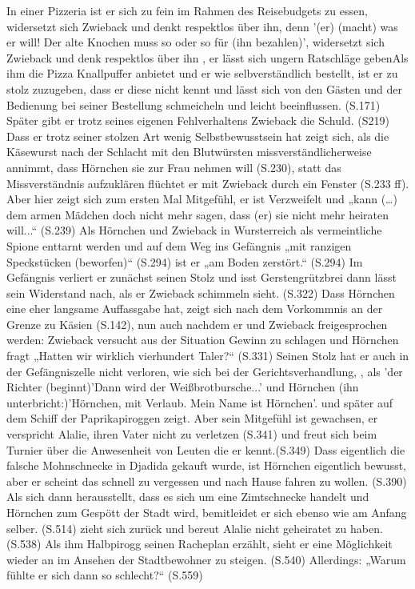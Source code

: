 {In einer Pizzeria ist er sich zu fein im Rahmen des Reisebudgets zu essen, widersetzt sich Zwieback und denkt respektlos über ihn\cite[S.170f]{pir}, denn '(er) (macht) was er will! Der alte Knochen muss so oder so für (ihn bezahlen)',\cite[S.170f]{pir} widersetzt sich Zwieback und denk respektlos über ihn \cite[S.170f]{pir}, er lässt sich ungern Ratschläge geben\cite[S.170f]{pir}\cite[S.219f]{pir}Als ihm die Pizza Knallpuffer anbietet und er wie selbverständlich bestellt, ist er zu stolz zuzugeben, dass er diese nicht kennt und lässt sich von den Gästen und der Bedienung bei seiner Bestellung schmeicheln und leicht beeinflussen. (S.171) Später gibt er trotz seines eigenen Fehlverhaltens Zwieback die Schuld. (S219) Dass er trotz seiner stolzen Art wenig Selbstbewusstsein hat zeigt sich, als die Käsewurst nach der Schlacht mit den Blutwürsten missverständlicherweise annimmt, dass Hörnchen sie zur Frau nehmen will (S.230), statt das Missverständnis aufzuklären flüchtet er mit Zwieback durch ein Fenster (S.233 ff). Aber hier zeigt sich zum ersten Mal Mitgefühl, er ist Verzweifelt und „kann (…) dem armen Mädchen doch nicht mehr sagen, dass (er) sie nicht mehr heiraten will...“ (S.239) Als Hörnchen und Zwieback in Wursterreich als vermeintliche Spione enttarnt werden und auf dem Weg ins Gefängnis „mit ranzigen Speckstücken (beworfen)“ (S.294) ist er „am Boden zerstört.“ (S.294) Im Gefängnis verliert er zunächst seinen Stolz und isst Gerstengrützbrei  dann lässt sein Widerstand nach, als er Zwieback schimmeln sieht. (S.322) Dass Hörnchen eine eher langsame Auffassgabe hat, zeigt sich nach dem Vorkommnis an der Grenze zu Käsien (S.142), nun auch nachdem er und Zwieback freigesprochen werden: Zwieback versucht aus der Situation Gewinn zu schlagen und Hörnchen fragt „Hatten wir wirklich vierhundert Taler?“ (S.331) Seinen Stolz hat er auch in der Gefängniszelle nicht verloren, wie sich bei der Gerichtsverhandlung, \cite[S.336]{pir}, als 'der Richter (beginnt)'Dann wird der Weißbrotbursche...' und Hörnchen (ihn unterbricht:)'Hörnchen, mit Verlaub. Mein Name ist Hörnchen'.\cite[S.336f]{pir} und später auf dem Schiff der Paprikapiroggen zeigt.\cite[S.367f]{pir} Aber sein Mitgefühl ist gewachsen, er verspricht Alalie, ihren Vater nicht zu verletzen (S.341) und freut sich beim Turnier über die Anwesenheit von Leuten die er kennt.(S.349) Dass eigentlich die falsche Mohnschnecke in Djadida gekauft wurde, ist Hörnchen eigentlich bewusst, aber er scheint das schnell zu vergessen und nach Hause fahren zu wollen. (S.390) Als sich dann herausstellt, dass es sich um eine Zimtschnecke handelt und Hörnchen zum Gespött der Stadt wird, bemitleidet er sich ebenso wie am Anfang selber. (S.514) zieht sich zurück und bereut Alalie nicht geheiratet zu haben. (S.538) Als ihm Halbpirogg seinen Racheplan erzählt, sieht er eine Möglichkeit wieder an im Ansehen der Stadtbewohner zu steigen. (S.540) Allerdings: „Warum fühlte er sich dann so schlecht?“ (S.559)

}

